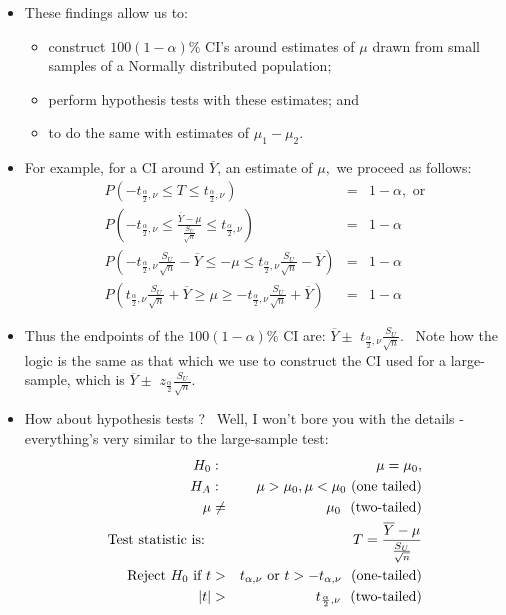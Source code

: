 \documentclass[11pt]{article}
\begin{document}
\begin{itemize}
\item These findings allow us to:

\begin{itemize}
\item construct $100(1-\alpha )\%$ CI's around estimates of $\mu $ drawn
from small samples of a Normally distributed population;

\item perform hypothesis tests with these estimates; and

\item to do the same with estimates of $\mu _{1}-\mu _{2}.$
\end{itemize}

\item For example, for a CI around $\overline{Y}$, an estimate of $\mu ,$ we
proceed as follows: 
\begin{eqnarray*}
P\left( -t_{\frac{\alpha }{2},\nu }\leq T\leq t_{\frac{\alpha }{2},\nu
}\right) &=&1-\alpha ,\text{ or} \\
P\left( -t_{\frac{\alpha }{2},\nu }\leq \frac{\overline{Y}-\mu }{\frac{S_{U}%
}{\sqrt{n}}}\leq t_{\frac{\alpha }{2},\nu }\right) &=&1-\alpha \\
P\left( -t_{\frac{\alpha }{2},\nu }\frac{S_{U}}{\sqrt{n}}-\overline{Y}\leq
-\mu \leq t_{\frac{\alpha }{2},\nu }\frac{S_{U}}{\sqrt{n}}-\overline{Y}%
\right) &=&1-\alpha \\
P\left( t_{\frac{\alpha }{2},\nu }\frac{S_{U}}{\sqrt{n}}+\overline{Y}\geq
\mu \geq -t_{\frac{\alpha }{2},\nu }\frac{S_{U}}{\sqrt{n}}+\overline{Y}%
\right) &=&1-\alpha
\end{eqnarray*}

\item Thus the endpoints of the $100(1-\alpha )\%$ CI are: $\overline{Y}\pm $
$t_{\frac{\alpha }{2},\nu }\frac{S_{U}}{\sqrt{n}}$. \ Note how the logic is
the same as that which we use to construct the CI used for a large-sample,
which is $\overline{Y}\pm $ $z_{\frac{\alpha }{2}}\frac{S_{U}}{\sqrt{n}}.$ \ 

\item How about hypothesis tests ? \ Well, I won't bore you with the details
- everything's very similar to the large-sample test:%
\begin{eqnarray*}
H_{0} &:&\mu =\mu _{0}, \\
H_{A} &:&\mu >\mu _{0},\mu <\mu _{0}\text{ (one tailed)} \\
\mu &\neq &\mu _{0}\text{ \ (two-tailed)} \\
\text{Test statistic is}\text{: } &&T=\frac{\overline{Y}-\mu }{\frac{S_{U}}{%
\sqrt{n}}} \\
\text{Reject }H_{0}\text{ if }t &>&t_{\alpha ,\nu }\text{ or }t>-t_{\alpha
,\nu }\text{ \ (one-tailed)} \\
\text{ }|t| &>&t_{\frac{\alpha }{2},\nu }\text{ \ (two-tailed)}
\end{eqnarray*}


\end{itemize}
\end{document}
